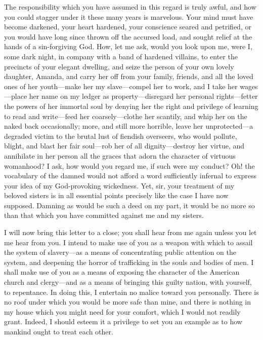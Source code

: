 The responsibility which you have assumed in this regard is truly awful,
and how you could stagger under it these many years is marvelous. Your
mind must have become darkened, your heart hardened, your conscience
seared and petrified, or you would have long since thrown off the
accursed load, and sought relief at the hands of a sin-forgiving God.
How, let me ask, would you look upon me, were I, some dark night, in
company with a band of hardened villains, to enter the precincts of your
elegant dwelling, and seize the person of your own lovely daughter,
Amanda, and carry her off from your family, friends, and all the loved
ones of her youth---make her my slave---compel her to work, and I take
her wages---place her name on my ledger as property---disregard her
personal rights---fetter the powers of her immortal soul by denying her
the right and privilege of learning to read and write---feed her
coarsely---clothe her scantily, and whip her on the naked back
occasionally; {\protect\hypertarget{428}{}{}}more, and still more
horrible, leave her unprotected---a degraded victim to the brutal lust
of fiendish overseers, who would pollute, blight, and blast her fair
soul---rob her of all dignity---destroy her virtue, and annihilate in
her person all the graces that adorn the character of virtuous
womanhood? I ask, how would you regard me, if such were my conduct? Oh!
the vocabulary of the damned would not afford a word sufficiently
infernal to express your idea of my God-provoking wickedness. Yet, sir,
your treatment of my beloved sisters is in all essential points
precisely like the case I have now supposed. Damning as would be such a
deed on my part, it would be no more so than that which you have
committed against me and my sisters.

I will now bring this letter to a close; you shall hear from me again
unless you let me hear from you. I intend to make use of you as a weapon
with which to assail the system of slavery---as a means of concentrating
public attention on the system, and deepening the horror of trafficking
in the souls and bodies of men. I shall make use of you as a means of
exposing the character of the American church and clergy---and as a
means of bringing this guilty nation, with yourself, to repentance. In
doing this, I entertain no malice toward you personally. There is no
roof under which you would be more safe than mine, and there is nothing
in my house which you might need for your comfort, which I would not
readily grant. Indeed, I should esteem it a privilege to set you an
example as to how mankind ought to treat each other.

